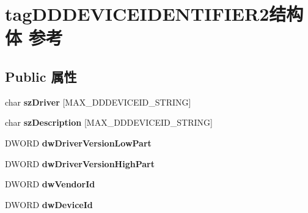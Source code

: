 \hypertarget{structtag_d_d_d_e_v_i_c_e_i_d_e_n_t_i_f_i_e_r2}{}\section{tag\+D\+D\+D\+E\+V\+I\+C\+E\+I\+D\+E\+N\+T\+I\+F\+I\+E\+R2结构体 参考}
\label{structtag_d_d_d_e_v_i_c_e_i_d_e_n_t_i_f_i_e_r2}
\subsection*{Public 属性}
\begin{DoxyCompactItemize}
\item 
\mbox{\label{structtag_d_d_d_e_v_i_c_e_i_d_e_n_t_i_f_i_e_r2_aef91466d23e868e26626fa0ab68026b2}} 
char {\bfseries sz\+Driver} \mbox{[}M\+A\+X\+\_\+\+D\+D\+D\+E\+V\+I\+C\+E\+I\+D\+\_\+\+S\+T\+R\+I\+NG\mbox{]}
\item 
\mbox{\label{structtag_d_d_d_e_v_i_c_e_i_d_e_n_t_i_f_i_e_r2_a5a5c856b7a8a703f4c2ab2d902881ae6}} 
char {\bfseries sz\+Description} \mbox{[}M\+A\+X\+\_\+\+D\+D\+D\+E\+V\+I\+C\+E\+I\+D\+\_\+\+S\+T\+R\+I\+NG\mbox{]}
\item 
\mbox{\label{structtag_d_d_d_e_v_i_c_e_i_d_e_n_t_i_f_i_e_r2_a1ae434312583a78639426a9c38f789d1}} 
D\+W\+O\+RD {\bfseries dw\+Driver\+Version\+Low\+Part}
\item 
\mbox{\label{structtag_d_d_d_e_v_i_c_e_i_d_e_n_t_i_f_i_e_r2_a47b2d044026ff1adb5e3aa4497bcb9c3}} 
D\+W\+O\+RD {\bfseries dw\+Driver\+Version\+High\+Part}
\item 
\mbox{\label{structtag_d_d_d_e_v_i_c_e_i_d_e_n_t_i_f_i_e_r2_a8303c35a61f88dc3df059cdfadc21202}} 
D\+W\+O\+RD {\bfseries dw\+Vendor\+Id}
\item 
\mbox{\label{structtag_d_d_d_e_v_i_c_e_i_d_e_n_t_i_f_i_e_r2_a6c4cb0e166eedbff896aee035cae5c5e}} 
D\+W\+O\+RD {\bfseries dw\+Device\+Id}
\item 

\end{DoxyCompactItemize}
